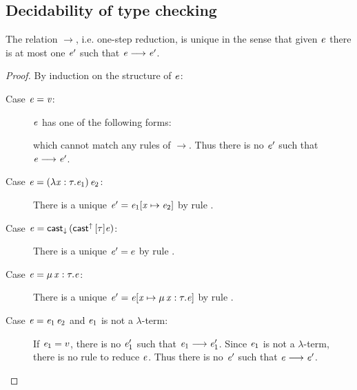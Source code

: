 \subsection{Decidability of type checking}
\begin{lem}\label{lem:unired}
	The relation $ \longrightarrow $, i.e. one-step reduction, is unique in the sense that given $\mathit{e}$ there is at most one $\mathit{e'}$ such that $\mathit{e}  \longrightarrow  \mathit{e'}$.
\end{lem}

\begin{proof}
	By induction on the structure of $\mathit{e}$:
	\begin{description}
		\item[Case $\mathit{e}  =  \mathit{v}$:] $\mathit{e}$ has one of the following forms:
		\begin{inparaenum}[(1)]
		    \item $\star$,
		    \item $\ottmv{x}$,
			\item $\lambda  \ottmv{x}  \ottsym{:}  \tau  \ottsym{.}  \ottnt{e}$,
			\item $\Pi \, \ottmv{x}  \ottsym{:}  \tau_{{\mathrm{1}}}  \ottsym{.}  \tau_{{\mathrm{2}}}$,
			\item $\kw{cast}^{\uparrow} \, \ottsym{[}  \tau  \ottsym{]}  \ottnt{e}$,
		\end{inparaenum}
		which cannot match any rules of $ \longrightarrow $. Thus there is no $\mathit{e}'$ such that $\mathit{e}  \longrightarrow  \mathit{e'}$.
		\item[Case $\mathit{e}=(  \lambda  \mathit{x}  :  \tau  .  \mathit{e_{{\mathrm{1}}}}  ) \, \mathit{e_{{\mathrm{2}}}}$:] There is a unique $\mathit{e}'=\mathit{e_{{\mathrm{1}}}}  [  \mathit{x}  \mapsto  \mathit{e_{{\mathrm{2}}}}  ]$ by rule .
		\item[Case $\mathit{e}=\mathsf{cast}_{\downarrow} \, (  \mathsf{cast}^{\uparrow} \, [  \tau  ]  \mathit{e}  )$:] There is a unique $\mathit{e}'=e$ by rule .
		\item[Case $\mathit{e}=\mu \, \mathit{x}  :  \tau  .  \mathit{e}$:] There is a unique $\mathit{e}'=\mathit{e}  [  \mathit{x}  \mapsto  \mu \, \mathit{x}  :  \tau  .  \mathit{e}  ]$ by rule .
		\item[Case $\mathit{e}=\mathit{e_{{\mathrm{1}}}} \, \mathit{e_{{\mathrm{2}}}}$ and $\mathit{e_{{\mathrm{1}}}}$ is not a $\lambda$-term:] If $\mathit{e_{{\mathrm{1}}}}=v$, there is no $\mathit{e'_{{\mathrm{1}}}}$ such that $\mathit{e_{{\mathrm{1}}}}  \longrightarrow  \mathit{e'_{{\mathrm{1}}}}$. Since $\mathit{e_{{\mathrm{1}}}}$ is not a $\lambda$-term, there is no rule to reduce $\mathit{e}$. Thus there is no $\mathit{e}'$ such that $\mathit{e}  \longrightarrow  \mathit{e'}$.
		

\end{description}
\end{proof}
